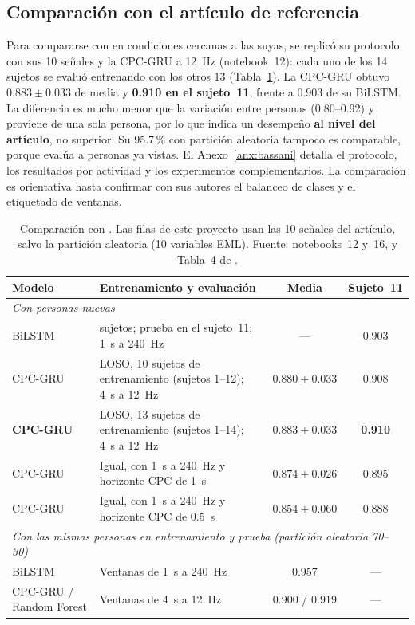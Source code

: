 \documentclass[letterpaper,11pt]{article}
\begin{document}
\subsection{Comparación con el artículo de referencia}
\label{sec:complementarias}
Para compararse con \textcite{bassani2025} en condiciones cercanas a las suyas, se replicó su protocolo con sus 10 señales y la CPC-GRU a 12~Hz (notebook~12): cada uno de los 14 sujetos se evaluó entrenando con los otros 13 (Tabla~\ref{tab:bassani_resumen}). La CPC-GRU obtuvo $0.883 \pm 0.033$ de media y \textbf{0.910 en el sujeto~11}, frente a 0.903 de su BiLSTM. La diferencia es mucho menor que la variación entre personas (0.80--0.92) y proviene de una sola persona, por lo que indica un desempeño \textbf{al nivel del artículo}, no superior. Su 95.7\,\% con partición aleatoria tampoco es comparable, porque evalúa a personas ya vistas. El Anexo~\ref{anx:bassani} detalla el protocolo, los resultados por actividad y los experimentos complementarios. La comparación es orientativa hasta confirmar con sus autores el balanceo de clases y el etiquetado de ventanas.

\begin{table}[H]
  \centering
  \small
  \caption{Comparación con \textcite{bassani2025}. Las filas de este proyecto usan las 10 señales del artículo, salvo la partición aleatoria (10 variables EML). Fuente: notebooks~12 y~16, y Tabla~4 de \textcite{bassani2025}.}
  \label{tab:bassani_resumen}
  \begin{tabular}{l>{\raggedright\arraybackslash}p{5.6cm}cc}
    \toprule
    Modelo & Entrenamiento y evaluación & Media & Sujeto~11 \\
    \midrule
    \multicolumn{4}{l}{\emph{Con personas nuevas}} \\
    BiLSTM \parencite{bassani2025} & 13 sujetos; prueba en el sujeto~11; 1~s a 240~Hz & --- & 0.903 \\
    CPC-GRU & LOSO, 10 sujetos de entrenamiento (sujetos 1--12); 4~s a 12~Hz & $0.880 \pm 0.033$ & 0.908 \\
    \textbf{CPC-GRU} & LOSO, 13 sujetos de entrenamiento (sujetos 1--14); 4~s a 12~Hz & $\mathbf{0.883} \pm 0.033$ & \textbf{0.910} \\
    CPC-GRU & Igual, con 1~s a 240~Hz y horizonte CPC de 1~s & $0.874 \pm 0.026$ & 0.895 \\
    CPC-GRU & Igual, con 1~s a 240~Hz y horizonte CPC de 0.5~s & $0.854 \pm 0.060$ & 0.888 \\
    \midrule
    \multicolumn{4}{l}{\emph{Con las mismas personas en entrenamiento y prueba (partición aleatoria 70--30)}} \\
    BiLSTM \parencite{bassani2025} & Ventanas de 1~s a 240~Hz & 0.957 & --- \\
    CPC-GRU / Random Forest & Ventanas de 4~s a 12~Hz & 0.900 / 0.919 & --- \\
    \bottomrule
  \end{tabular}
\end{table}
\end{document}

